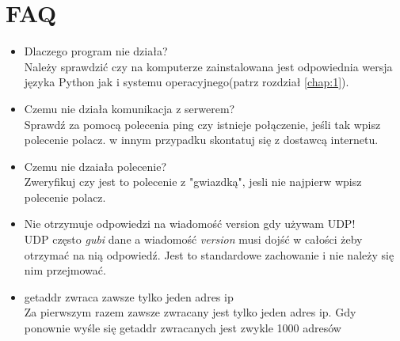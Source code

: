 \documentclass[a4paper,polish,12pt]{article}
\begin{document}
\section{FAQ}
\begin{itemize}
\item Dlaczego program nie działa?\\
Należy sprawdzić czy na komputerze zainstalowana jest odpowiednia wersja języka Python jak i systemu operacyjnego(patrz rozdział \autoref{chap:1}).
\item Czemu nie działa komunikacja z serwerem?\\
Sprawdź za pomocą polecenia ping czy istnieje połączenie, jeśli tak wpisz polecenie polacz. w innym przypadku skontatuj się z dostawcą internetu.
\item Czemu nie dzaiała polecenie?\\
Zweryfikuj czy jest to polecenie z "gwiazdką", jesli nie najpierw wpisz polecenie polacz.
\item Nie otrzymuje odpowiedzi na wiadomość version gdy używam UDP!\\
UDP często \textit{gubi} dane a wiadomość \textit{version} musi dojść w całości żeby otrzymać na nią odpowiedź. Jest to standardowe zachowanie i nie należy się nim przejmować.
\item getaddr zwraca zawsze tylko jeden adres ip\\
Za pierwszym razem zawsze zwracany jest tylko jeden adres ip. Gdy ponownie wyśle się getaddr zwracanych jest zwykle 1000 adresów

\end{itemize}
\end{document}
